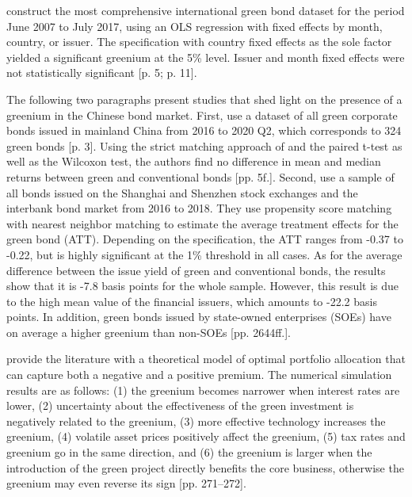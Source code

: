 \citet{tang2020shareholders} construct the most comprehensive international green bond dataset for the period June 2007 to July 2017, using an OLS regression with fixed effects by month, country, or issuer. The specification with country fixed effects as the sole factor yielded a significant greenium at the 5\% level. Issuer and month fixed effects were not statistically significant [p. 5; p. 11].

The following two paragraphs present studies that shed light on the presence of a greenium in the Chinese bond market. First, \citet{wang2020benefits} use a dataset of all green corporate bonds issued in mainland China from 2016 to 2020 Q2, which corresponds to 324 green bonds [p. 3]. Using the strict matching approach of \citet{larcker2020s} and the paired t-test as well as the Wilcoxon test, the authors find no difference in mean and median returns between green and conventional bonds [pp. 5f.]. Second, \citet{sheng2021financing} use a sample of all bonds issued on the Shanghai and Shenzhen stock exchanges and the interbank bond market from 2016 to 2018. They use propensity score matching with nearest neighbor matching to estimate the average treatment effects for the green bond (ATT). Depending on the specification, the ATT ranges from -0.37 to -0.22, but is highly significant at the 1\% threshold in all cases. As for the average difference between the issue yield of green and conventional bonds, the results show that it is -7.8 basis points for the whole sample. However, this result is due to the high mean value of the financial issuers, which amounts to -22.2 basis points. In addition, green bonds issued by state-owned enterprises (SOEs) have on average a higher greenium than non-SOEs [pp. 2644ff.]. 

\citet{agliardi2021corporate} provide the literature with a theoretical model of optimal portfolio allocation that can capture both a negative and a positive premium. The numerical simulation results are as follows: (1) the greenium becomes narrower when interest rates are lower, (2) uncertainty about the effectiveness of the green investment is negatively related to the greenium, (3) more effective technology increases the greenium, (4) volatile asset prices positively affect the greenium, (5) tax rates and greenium go in the same direction, and (6) the greenium is larger when the introduction of the green project directly benefits the core business, otherwise the greenium may even reverse its sign [pp. 271--272].

